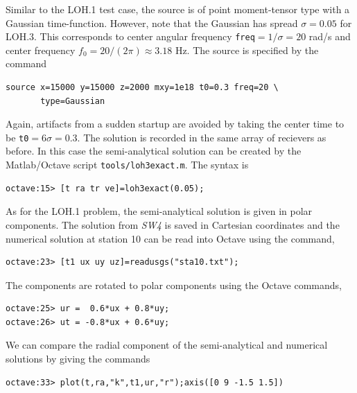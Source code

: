 \documentclass[11pt]{report}
\begin{document}
Similar to the LOH.1 test case, the source is of point moment-tensor type with a Gaussian
time-function. However, note that the Gaussian has spread $\sigma=0.05$ for LOH.3. This corresponds
to center angular frequency {\tt freq}$= 1/\sigma=20$ rad/s and center frequency
$f_0=20/(2\pi)\approx 3.18$ Hz. The source is specified by the command
\begin{verbatim}
source x=15000 y=15000 z=2000 mxy=1e18 t0=0.3 freq=20 \
       type=Gaussian
\end{verbatim}
Again, artifacts from a sudden startup are avoided by taking the center time to be {\tt t0}$=6
\sigma = 0.3$.  The solution is recorded in the same array of recievers as before.
In this case the semi-analytical solution can be created by the Matlab/Octave script
\verb+tools/loh3exact.m+. The syntax is
\begin{verbatim}
octave:15> [t ra tr ve]=loh3exact(0.05);
\end{verbatim}
As for the LOH.1 problem, the semi-analytical solution is given in polar components. The solution
from \emph{SW4} is saved in Cartesian coordinates and the numerical solution at station 10 can be
read into Octave using the command,
\begin{verbatim}
octave:23> [t1 ux uy uz]=readusgs("sta10.txt");
\end{verbatim}
The components are rotated to polar components using the Octave commands,
\begin{verbatim}
octave:25> ur =  0.6*ux + 0.8*uy;
octave:26> ut = -0.8*ux + 0.6*uy;
\end{verbatim}
We can compare the radial component of the semi-analytical and numerical solutions by giving the
commands
\begin{verbatim}
octave:33> plot(t,ra,"k",t1,ur,"r");axis([0 9 -1.5 1.5])
\end{verbatim}
\end{document}
